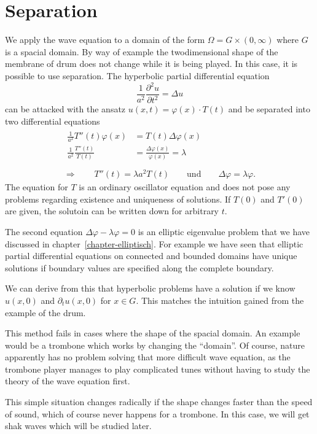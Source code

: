 %
%
%
\section{Separation}
We apply the wave equation to a domain of the form
$\Omega = G\times(0,\infty)$ where $G$ is a spacial domain.
By way of example the twodimensional shape of the membrane of drum
does not change while it is being played.
In this case, it is possible to use separation.
The hyperbolic partial differential equation
\[
\frac1{a^2}\frac{\partial^2 u}{\partial t^2}=\Delta u
\]
can be attacked with the ansatz $u(x,t)=\varphi(x)\cdot T(t)$ and be 
separated into two differential equations
\begin{gather*}
\begin{aligned}
\frac1{a^2}T''(t)\varphi(x)&=T(t)\Delta \varphi(x)\\
\frac1{a^2}\frac{T''(t)}{T(t)}&=\frac{\Delta\varphi(x)}{\varphi(x)}=\lambda\\
\end{aligned}
\\
\Rightarrow\qquad
T''(t)=\lambda a^2T(t)\qquad\text{und}\qquad\Delta \varphi=\lambda\varphi.
\end{gather*}
The equation for $T$ is an ordinary oscillator equation and does
not pose any problems regarding existence and uniqueness of solutions.
If $T(0)$ and $T'(0)$ are given, the solutoin can be written down
for arbitrary $t$.

The second equation $\Delta \varphi-\lambda\varphi=0$ is an elliptic
eigenvalue problem that we have discussed in chapter~\ref{chapter-elliptisch}.
For example we have seen that elliptic partial differential equations
on connected and bounded domains have unique solutions if boundary
values are specified along the complete boundary.

We can derive from this that hyperbolic problems have a solution if
we know $u(x,0)$ and $\partial_tu(x,0)$ for $x\in G$.
This matches the intuition gained from the example of the drum.

This method fails in cases where the shape of the spacial domain.
An example would be a trombone which works by changing the
``domain''. 
Of course, nature apparently has no problem solving that more 
difficult wave equation, as the trombone player manages to play
complicated tunes without having to study the theory of the
wave equation first.

This simple situation changes radically if the shape changes faster than
the speed of sound, which of course never happens for a trombone.
In this case, we will get shak waves which will be studied later.

